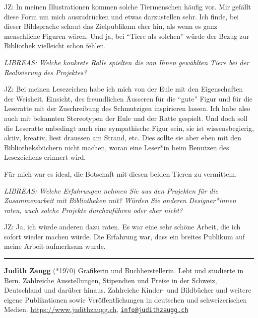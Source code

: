\documentclass[a4paper,
fontsize=11pt,
oneside,
numbers=noperiodatend,
parskip=half-,
bibliography=totoc,
final
]{scrartcl}
\begin{document}
JZ: In meinen Illustrationen kommen solche Tiermenschen häufig vor. Mir
gefällt diese Form um mich auszudrücken und etwas darzustellen sehr. Ich
finde, bei dieser Bildsprache schaut das Zielpublikum eher hin, als wenn
es ganz menschliche Figuren wären. Und ja, bei \enquote{Tiere als
solchen} würde der Bezug zur Bibliothek vielleicht schon fehlen.

\emph{LIBREAS: Welche konkrete Rolle spielten die von Ihnen gewählten
Tiere bei der Realisierung des Projektes?}

JZ: Bei meinen Lesezeichen habe ich mich von der Eule mit den
Eigenschaften der Weisheit, Einsicht, des freundlichen Äusseren für die
\enquote{gute} Figur und für die Leseratte mit der Zuschreibung des
Schmutzigen inspirieren lassen. Ich habe also auch mit bekannten
Stereotypen der Eule und der Ratte gespielt. Und doch soll die Leseratte
unbedingt auch eine sympathische Figur sein, sie ist wissensbegierig,
aktiv, kreativ, liest draussen am Strand, etc. Dies sollte sie aber eben
mit den Bibliotheksbüchern nicht machen, woran eine Leser*in beim
Benutzen des Lesezeichens erinnert wird.

Für mich war es ideal, die Botschaft mit diesen beiden Tieren zu
vermitteln.

\emph{LIBREAS: Welche Erfahrungen nehmen Sie aus den Projekten für die
Zusammenarbeit mit Bibliotheken mit? Würden Sie anderen Designer*innen
raten, auch solche Projekte durchzuführen oder eher nicht?}

JZ: Ja, ich würde anderen dazu raten. Es war eine sehr schöne Arbeit,
die ich sofort wieder machen würde. Die Erfahrung war, dass ein breites
Publikum auf meine Arbeit aufmerksam wurde.

\begin{center}\rule{0.5\linewidth}{0.5pt}\end{center}

\textbf{Judith Zaugg} (*1970) Grafikerin und Buchherstellerin. Lebt und
studierte in Bern. Zahlreiche Ausstellungen, Stipendien und Preise in
der Schweiz, Deutschland und darüber hinaus. Zahlreiche Kinder- und
Bildbücher und weitere eigene Publikationen sowie Veröffentlichungen in
deutschen und schweizerischen Medien. \url{https://www.judithzaugg.ch},
\href{mailto:info@judithzaugg.ch}{\nolinkurl{info@judithzaugg.ch}}
\end{document}
